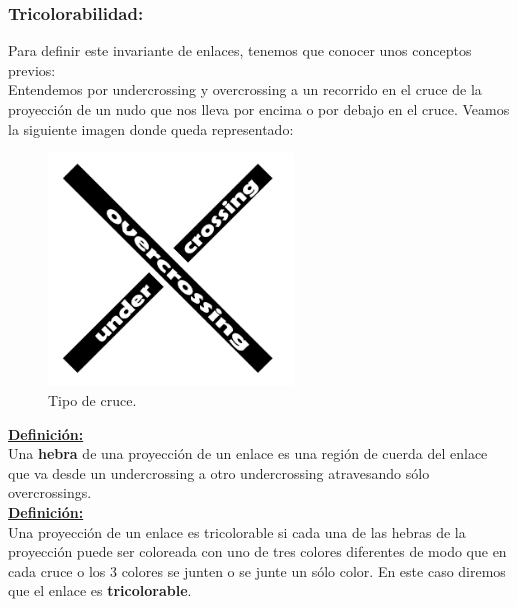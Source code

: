 \documentclass[14pt]{extarticle}
\begin{document}
\begin{center}
	\subsubsection{Tricolorabilidad:}
\end{center}
Para definir este invariante de enlaces, tenemos que conocer unos conceptos previos:\\
Entendemos por undercrossing y overcrossing a un recorrido en el cruce de la proyección de un nudo que nos lleva por encima o por debajo en el cruce. Veamos la siguiente imagen donde queda representado:\\
   \begin{figure}[h!]
   	\centering
   	\includegraphics[width=6.5cm]{inudos/cruce.png}
   	\caption{Tipo de cruce.}
   	\label{tric1} 
   \end{figure}

\underline{\textbf{Definición:}}\\
Una\textbf{ hebra }de una proyección de un enlace es una región de cuerda del enlace que va desde un undercrossing a otro undercrossing atravesando sólo overcrossings.\\ 

\underline{\textbf{Definición:}}\\
Una proyección de un enlace es tricolorable si cada una de las hebras de la proyección puede ser coloreada con uno de tres colores diferentes de modo que en cada cruce o los 3 colores se junten o se junte un sólo color. En este caso diremos que el enlace es \textbf{tricolorable}. 
\end{document}
